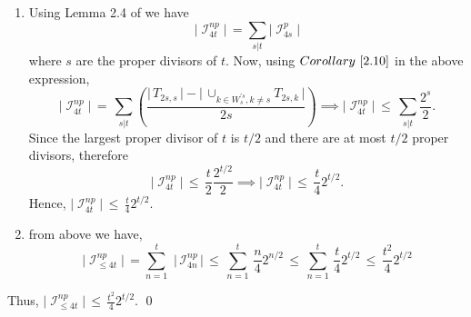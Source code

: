 \documentclass[a4paper,12pt]{amsart}
\renewenvironment{proof}{{\bfseries Proof.}}{\qed}
\numberwithin{equation}{section}
\theoremstyle{definition}
\newcommand{\corref}[1]{Corollary~\ref{#1}}
\numberwithin{equation}{section}
\begin{document}
\begin{proof}
\begin{enumerate}
\item Using Lemma 2.4 of \cite{combigrowth} we have $$ \lvert \;\mathscr{I}^{np}_{4t}\;\rvert\,=\sum_{s |t }\lvert \;\mathscr{I}^p_{4s}\;\rvert$$ where $s$ are the proper divisors of $t$. Now, using $\corref{2.10}$ in the above expression, 
$$\lvert \;\mathscr{I}^{np}_{4t}\;\rvert\,=\,\sum_{s |t }\left ( \frac{\lvert \,T_{2s,s}\, \rvert- \lvert\,\cup_{k\in W_s^{'s}, k \neq s} T_{2s,k}\,\rvert}{2s}\right)\implies\lvert \;\mathscr{I}^{np}_{4t}\;\rvert\,\leq \,\sum_{s |t } \frac{2^s}{2}.$$
Since the largest proper divisor of $t$ is $t/2$ and there are at most $t/2$ proper divisors, therefore
$$\lvert \;\mathscr{I}^{np}_{4t}\;\rvert\,\leq \,\frac{t}{2} \frac{2^{t/2}}{2} \implies\lvert \;\mathscr{I}^{np}_{4t}\;\rvert\,\leq \,\frac{t}{4}2^{t/2}.$$
Hence, $\lvert \;\mathscr{I}^{np}_{4t}\;\rvert\, \leq\, \frac{t}{4}2^{t/2}.$
  \item from above we have, 
   $$ \lvert \;\mathscr{I}^{np}_{\leq4t}\;\rvert\,=\sum_{n=1}^{t}\,\,\lvert\, \mathscr{I}_{4n}^{np}\,\rvert\,\leq\,\sum_{n=1}^{t}\,\frac{n}{4}2^{n/2}\,\leq\,\sum_{n=1}^{t}\,\frac{t}{4}2^{t/2}\,\leq\,\frac{t^2}{4}2^{t/2}$$
    \end{enumerate}
    Thus, $\lvert \;\mathscr{I}^{np}_{\leq4t}\;\rvert\,\leq\,\frac{t^2}{4}2^{t/2}.$
    \end{proof}
   
\end{document}
